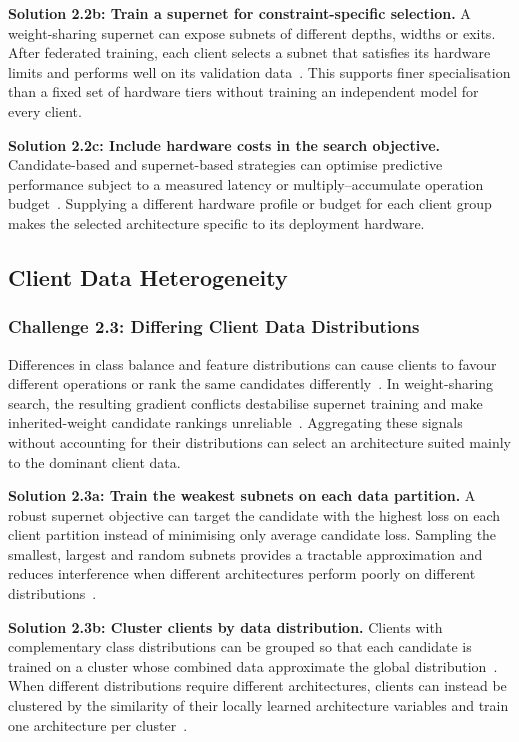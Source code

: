 \noindent\textbf{Solution 2.2b: Train a supernet for constraint-specific selection.} A weight-sharing supernet can expose subnets of different depths, widths or exits. After federated training, each client selects a subnet that satisfies its hardware limits and performs well on its validation data~\cite{superfednas_2024,hapfnas_2025,enasfl_2024}. This supports finer specialisation than a fixed set of hardware tiers without training an independent model for every client.

\noindent\textbf{Solution 2.2c: Include hardware costs in the search objective.} Candidate-based and supernet-based strategies can optimise predictive performance subject to a measured latency or multiply--accumulate operation budget~\cite{clustered_direct_fednas_2022,load_monitoring_fednas_2025,fgfl_2024}. Supplying a different hardware profile or budget for each client group makes the selected architecture specific to its deployment hardware.

\subsection{Client Data Heterogeneity}

\subsubsection{Challenge 2.3: Differing Client Data Distributions}

Differences in class balance and feature distributions can cause clients to favour different operations or rank the same candidates differently~\cite{collaborative_nas_for_pfl_2025,superfednas_2024}. In weight-sharing search, the resulting gradient conflicts destabilise supernet training and make inherited-weight candidate rankings unreliable~\cite{hapfnas_2025}. Aggregating these signals without accounting for their distributions can select an architecture suited mainly to the dominant client data.

\noindent\textbf{Solution 2.3a: Train the weakest subnets on each data partition.} A robust supernet objective can target the candidate with the highest loss on each client partition instead of minimising only average candidate loss. Sampling the smallest, largest and random subnets provides a tractable approximation and reduces interference when different architectures perform poorly on different distributions~\cite{superfednas_2024}.

\noindent\textbf{Solution 2.3b: Cluster clients by data distribution.} Clients with complementary class distributions can be grouped so that each candidate is trained on a cluster whose combined data approximate the global distribution~\cite{finch_2024}. When different distributions require different architectures, clients can instead be clustered by the similarity of their locally learned architecture variables and train one architecture per cluster~\cite{electricity_load_forecasting_fl_darts_2023}.

